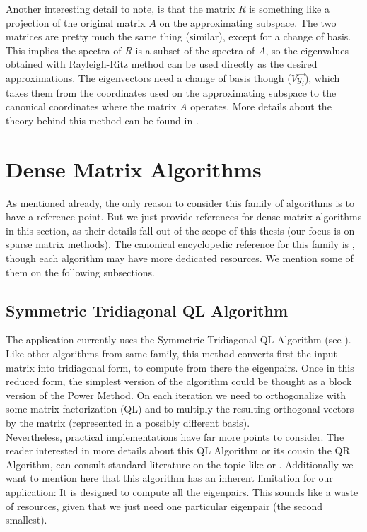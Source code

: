 Another interesting detail to note, is that the
matrix $R$ is something like a projection of the original matrix $A$
on the approximating subspace. The two matrices are pretty much the
same thing (similar), except for a change of 
basis. This implies the spectra of $R$ is a subset of the spectra of
$A$, so the eigenvalues obtained with Rayleigh-Ritz method can be used
directly as the desired approximations. The eigenvectors need a change
of basis though ($V\vec{y_i}$), which takes them from the coordinates
used on the approximating subspace to the canonical coordinates where
the matrix $A$ operates. More details about the theory behind this
method can be found in \cite{saad92}.

\section{Dense Matrix Algorithms}

As mentioned already, the only reason to consider this family of
algorithms is to have a reference point. But we just provide references for 
dense matrix algorithms in this section, as their details fall out of the scope of
this thesis (our focus is on sparse matrix methods). The canonical
encyclopedic reference for this family is \cite{golub13}, though each
algorithm may have more dedicated resources. We mention some of them on the following
subsections. \\

\subsection{Symmetric Tridiagonal QL Algorithm}
The application currently uses the Symmetric Tridiagonal QL
Algorithm (see \cite{parlett80}). Like other algorithms from same family, this method
converts first the input matrix into tridiagonal form, to
compute from there the eigenpairs. Once in this reduced form, the
simplest version of the algorithm could be thought as a block
version of the Power Method. On each iteration we need to
orthogonalize with some matrix factorization (QL) and to multiply the
resulting orthogonal vectors by the matrix (represented in a possibly
different basis). \\

Nevertheless, practical implementations have far
more points to consider. The reader interested in more details about
this QL Algorithm or its cousin the QR Algorithm, can consult
standard literature on the topic like \cite{golub13} or
\cite{parlett80}. Additionally we want to mention
here that this algorithm has an inherent limitation for our
application: It is designed to compute all the eigenpairs. This sounds
like a waste of resources, given that we just need one particular
eigenpair (the second smallest). 

